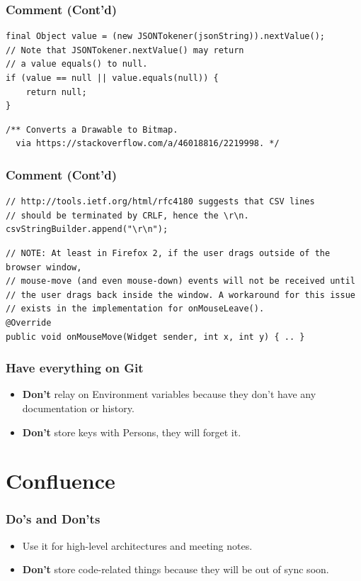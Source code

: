 \documentclass{efd-lecture}
\begin{document}
\begin{frame}[fragile]
  \frametitle{Comment (Cont'd)}
  \begin{verbatim}
final Object value = (new JSONTokener(jsonString)).nextValue();
// Note that JSONTokener.nextValue() may return
// a value equals() to null.
if (value == null || value.equals(null)) {
    return null;
}
  \end{verbatim}
  \begin{verbatim}
/** Converts a Drawable to Bitmap.
  via https://stackoverflow.com/a/46018816/2219998. */
  \end{verbatim}
\end{frame}

\begin{frame}[fragile]
  \frametitle{Comment (Cont'd)}
  \scriptsize
  \begin{verbatim}
// http://tools.ietf.org/html/rfc4180 suggests that CSV lines
// should be terminated by CRLF, hence the \r\n.
csvStringBuilder.append("\r\n");
  \end{verbatim}
  \begin{verbatim}
// NOTE: At least in Firefox 2, if the user drags outside of the browser window,
// mouse-move (and even mouse-down) events will not be received until
// the user drags back inside the window. A workaround for this issue
// exists in the implementation for onMouseLeave().
@Override
public void onMouseMove(Widget sender, int x, int y) { .. }
  \end{verbatim}
\end{frame}

\begin{frame}
  \frametitle{Have everything on Git}
  \begin{itemize}
    \item \textbf{\color{RubineRed}Don't} relay on Environment variables because they don't have any documentation or history.
    \item \textbf{\color{RubineRed}Don't} store keys with Persons, they will forget it.
  \end{itemize}
\end{frame}

\section{Confluence}

\begin{frame}
  \frametitle{Do's and Don'ts}
  \begin{itemize}
    \item Use it for high-level architectures and meeting notes.
    \item \textbf{\color{RubineRed}Don't} store code-related things because they will be out of sync soon.
  \end{itemize}
\end{frame}
\end{document}
